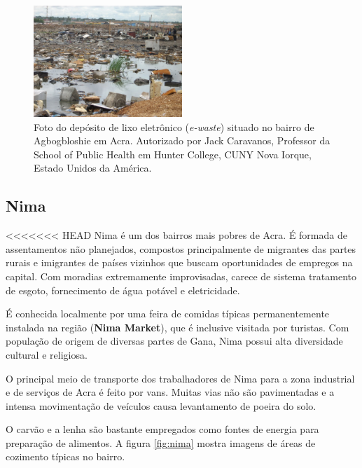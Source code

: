 \begin{figure}[H]
  \centering
  \includegraphics[width=0.5\textwidth]{../inputs/images/ewaste_jack_caravano.jpg}
  \caption{Foto do depósito de lixo eletrônico (\textit{e-waste}) situado no bairro 
           de Agbogbloshie em Acra. Autorizado por Jack Caravanos, 
           Professor da School of Public Health em Hunter College, CUNY
           Nova Iorque, Estado Unidos da América. \label{fig:ewaste}}
\end{figure}

\subsection{Nima}

<<<<<<< HEAD
Nima é um dos bairros mais pobres de Acra. É formada de assentamentos não 
planejados, compostos principalmente de migrantes das partes rurais e 
imigrantes de países vizinhos que buscam oportunidades de empregos na capital. 
Com moradias extremamente improvisadas, carece de sistema tratamento de esgoto, 
fornecimento de água potável e eletricidade. 

É conhecida localmente por uma feira de comidas típicas permanentemente 
instalada na região (\textbf{Nima Market}), que é inclusive visitada por turistas.
Com população de origem de diversas partes de Gana, Nima possui 
alta diversidade cultural e religiosa.

O principal meio de transporte dos trabalhadores de Nima para a zona industrial
e de serviços de Acra é feito por vans. 
Muitas vias não são pavimentadas e a intensa movimentação de veículos causa 
levantamento de poeira do solo.

O carvão e a lenha são bastante empregados como fontes de energia para preparação de 
alimentos. A figura \ref{fig:nima} mostra imagens de áreas de cozimento típicas no bairro.


